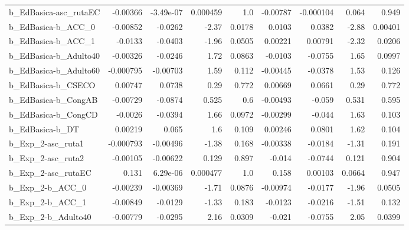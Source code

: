 \begin{tabular}{lrrrrrrrr}
b\_EdBasica-asc\_rutaEC      &    -0.00366 &    -3.49e-07 &  0.000459 &      1.0 &   -0.00787 &   -0.000104 &        0.064 &         0.949 \\
b\_EdBasica-b\_ACC\_0         &    -0.00852 &      -0.0262 &     -2.37 &   0.0178 &     0.0103 &      0.0382 &        -2.88 &       0.00401 \\
b\_EdBasica-b\_ACC\_1         &     -0.0133 &      -0.0403 &     -1.96 &   0.0505 &    0.00221 &     0.00791 &        -2.32 &        0.0206 \\
b\_EdBasica-b\_Adulto40      &    -0.00326 &      -0.0246 &      1.72 &   0.0863 &    -0.0103 &     -0.0755 &         1.65 &        0.0997 \\
b\_EdBasica-b\_Adulto60      &   -0.000795 &     -0.00703 &      1.59 &    0.112 &   -0.00445 &     -0.0378 &         1.53 &         0.126 \\
b\_EdBasica-b\_CSECO         &     0.00747 &       0.0738 &      0.29 &    0.772 &    0.00669 &      0.0661 &         0.29 &         0.772 \\
b\_EdBasica-b\_CongAB        &    -0.00729 &      -0.0874 &     0.525 &      0.6 &   -0.00493 &      -0.059 &        0.531 &         0.595 \\
b\_EdBasica-b\_CongCD        &     -0.0026 &      -0.0394 &      1.66 &   0.0972 &   -0.00299 &      -0.044 &         1.63 &         0.103 \\
b\_EdBasica-b\_DT            &     0.00219 &        0.065 &       1.6 &    0.109 &    0.00246 &      0.0801 &         1.62 &         0.104 \\
b\_Exp\_2-asc\_ruta1          &   -0.000793 &     -0.00496 &     -1.38 &    0.168 &   -0.00338 &     -0.0184 &        -1.31 &         0.191 \\
b\_Exp\_2-asc\_ruta2          &    -0.00105 &     -0.00622 &     0.129 &    0.897 &     -0.014 &     -0.0744 &        0.121 &         0.904 \\
b\_Exp\_2-asc\_rutaEC         &       0.131 &     6.29e-06 &  0.000477 &      1.0 &      0.158 &     0.00103 &       0.0664 &         0.947 \\
b\_Exp\_2-b\_ACC\_0            &    -0.00239 &     -0.00369 &     -1.71 &   0.0876 &   -0.00974 &     -0.0177 &        -1.96 &        0.0505 \\
b\_Exp\_2-b\_ACC\_1            &    -0.00849 &      -0.0129 &     -1.33 &    0.183 &    -0.0123 &     -0.0216 &        -1.51 &         0.132 \\
b\_Exp\_2-b\_Adulto40         &    -0.00779 &      -0.0295 &      2.16 &   0.0309 &     -0.021 &     -0.0755 &         2.05 &        0.0399 \\

\end{tabular}
